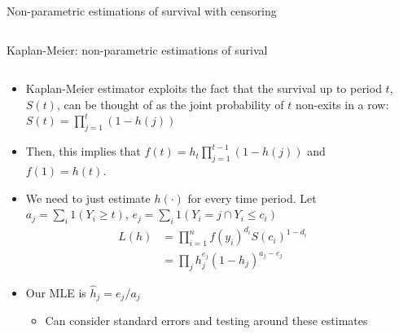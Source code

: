 \documentclass[notes,11pt, aspectratio=169]{beamer}
\begin{document}
\begin{frame}{Non-parametric estimations of survival with censoring}
\begin{columns}[T]
\begin{column}{.5\textwidth}
  \end{column}
\end{columns}
\end{frame}


\begin{frame}{Kaplan-Meier: non-parametric estimations of surival}
  \begin{columns}[T] %
    \begin{column}{.8\textwidth}
      \begin{itemize}
      \item Kaplan-Meier estimator exploits the fact that the survival
        up to period $t$, $S(t)$, can be thought of as the joint
        probability of $t$ non-exits in a row:
        $S(t) = \prod_{j = 1}^{t}(1-h(j))$
      \item Then, this implies that
        $f(t) = h_{t}\prod_{j = 1}^{t-1}(1-h(j))$ and $f(1) = h(t)$.
      \item We need to just estimate $h(\cdot)$ for every time period.
        Let $a_{j} = \sum_{i} 1(Y_{i} \geq t) $,
        $e_{j} = \sum_{i} 1(Y_{i} = j \cap Y_{i} \leq c_{i})$
      \begin{align*}
        L(h) &= \prod_{i=1}^{n} f(y_{i})^{d_{i}}S(c_{i})^{1-d_{i}} \\
             &= \prod_{j} h_{j}^{e_{j}}(1-h_{j})^{a_{j}-e_{j}}
      \end{align*}
    \item Our MLE is $\hat{h}_{j} = e_{j}/a_{j}$
      \begin{itemize}
      \item Can consider standard errors and testing around these
        estimates
      \end{itemize}
  \end{itemize}
    \end{column}%
  \hfill%
  \begin{column}{.2\textwidth}
  \end{column}
\end{columns}
\end{frame}
\end{document}
